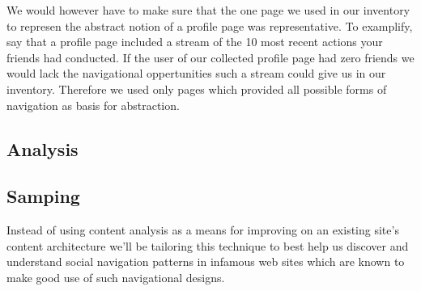 We would however have to make sure that the one page we used in our inventory
to represen the abstract notion of a profile page was representative. To
examplify, say that a profile page included a stream of the 10 most recent
actions your friends had conducted. If the user of our collected profile page
had zero friends we would lack the navigational oppertunities such a stream
could give us in our inventory. Therefore we used only pages which provided
all possible forms of navigation as basis for abstraction.


\subsection{Analysis}

\subsection{Samping}


Instead of using content analysis as a means for improving on an existing
site's content architecture we'll be tailoring this technique to best help us
discover and understand social navigation patterns in infamous web sites which
are known to make good use of such navigational designs.

